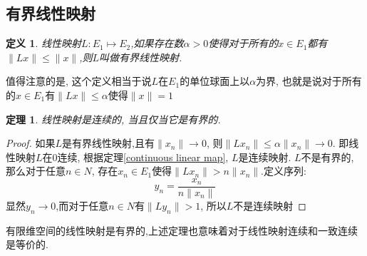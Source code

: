 \documentclass[a4paper,11pt]{book}
\newtheorem{definition}{\hspace{2em}定义}[section]
\newtheorem{theorem}{\hspace{2em}定理}[section]
\newtheorem{proof}{证明}[section]
\begin{document}
\subsection*{有界线性映射}
\begin{definition}
  线性映射$L:E_1\mapsto E_2$,如果存在数$\alpha>0$使得对于所有的$x\in E_1$都有$\|Lx\|\leq\|x\|$,则$L$叫做有界线性映射.
\end{definition}
值得注意的是, 这个定义相当于说$L$在$E_1$的单位球面上以$\alpha$为界, 也就是说对于所有的$x\in E_1$有$\|Lx\|\leq\alpha$使得$\|x\|=1$
\begin{theorem}
  线性映射是连续的, 当且仅当它是有界的.
\end{theorem}
\begin{proof}
  如果$L$是有界线性映射,且有$\|x_n\|\to 0$, 则$\|Lx_n\|\leq\alpha\|x_n\|\to 0$. 即线性映射$L$在$0$连续, 根据定理\ref{continuous linear map}, $L$是连续映射.
  $L$不是有界的, 那么对于任意$n\in N$, 存在$x_n\in E_1$使得$\|Lx_n\|>n\|x_n\|$.定义序列:
  \begin{equation*}
    y_n=\frac{x_n}{n\|x_n\|}
  \end{equation*}
  显然$y_n\to 0$,而对于任意$n\in N$有$\|Ly_n\|>1$, 所以$L$不是连续映射
\end{proof}
有限维空间的线性映射是有界的,上述定理也意味着对于线性映射连续和一致连续是等价的.
\end{document}
